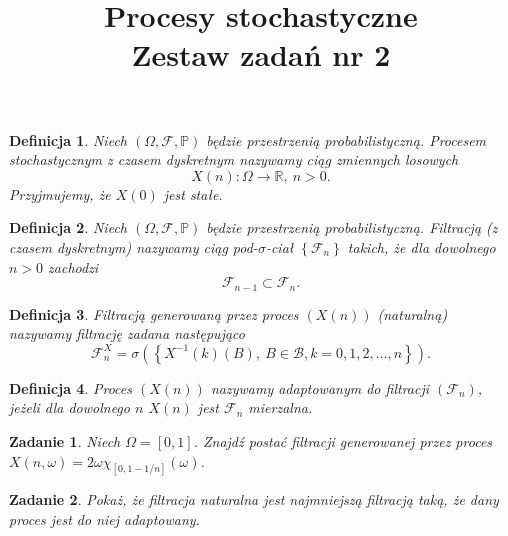 \documentclass[12pt]{mwart}
\title{Procesy stochastyczne\\ Zestaw zadań nr 2}
\newtheorem{df}{Definicja}
\newtheorem{zd}{Zadanie}
\begin{document}
\maketitle
\begin{df}
	Niech $\left( \Omega, \mathcal{F}, \mathbb{P}\right)$ będzie przestrzenią probabilistyczną. Procesem stochastycznym z czasem dyskretnym nazywamy ciąg zmiennych losowych	
	\begin{displaymath}
	X(n)\colon \Omega \to \mathbb{R},\ n>0.
	\end{displaymath}
	Przyjmujemy, że $X(0)$ jest stałe.
\end{df}
\begin{df}
	Niech $\left( \Omega, \mathcal{F}, \mathbb{P}\right)$ będzie przestrzenią probabilistyczną. Filtracją (z czasem dyskretnym) nazywamy ciąg pod-$\sigma$-ciał $\left\{\mathcal{F}_n\right\}$ takich, że dla dowolnego $n > 0$ zachodzi
	\begin{displaymath}
	\mathcal{F}_{n-1} \subset \mathcal{F}_n.
	\end{displaymath}
\end{df}
\begin{df}
	Filtracją generowaną przez proces $\left(X(n)\right)$ (naturalną) nazywamy filtrację zadana następująco
	\begin{displaymath}
	\mathcal{F}_n^X = \sigma\left( \left\{ X^{-1}(k)(B),\ B \in \mathcal{B}, k = 0, 1,2, \dots , n \right\}\right).
	\end{displaymath}
\end{df} 
\begin{df}
	Proces $\left(X(n)\right)$ nazywamy adaptowanym do filtracji $\left(\mathcal{F}_n\right)$, jeżeli dla dowolnego $n$ $X(n)$ jest $\mathcal{F}_n$ mierzalna.
\end{df}
\begin{zd}
	Niech $\Omega = [0,1]$. Znajdź postać filtracji generowanej przez proces $X(n,\omega) = 2\omega \chi_{[0, 1 - 1/n]}(\omega)$.
\end{zd}

\begin{zd}
	Pokaż, że filtracja naturalna jest najmniejszą filtracją taką, że dany proces jest do niej adaptowany.
\end{zd}
\end{document}
